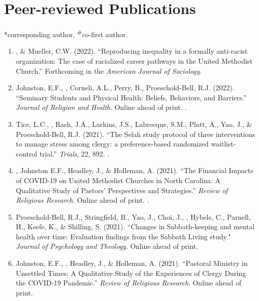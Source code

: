 \newcommand{\Revision}{\textit{under revision}}
\newcommand{\CS}{*} %
\newcommand{\CF}{\textsuperscript{\#}} %

\section*{Peer-reviewed Publications}
\CS corresponding author, \CF co-first author.

\begin{enumerate}
\item \Eagle, \& Mueller, C.W. (2022). ``Reproducing inequality in a formally anti-racist organization: The case of racialized career pathways in the United Methodist Church.'' Forthcoming in the \textit{American Journal of Sociology}.

\item Johnston, E.F., \Eagle, Corneli, A.L., Perry, B., Proeschold-Bell, R.J.  (2022). ``Seminary Students and Physical Health: Beliefs, Behaviors, and Barriers.'' \textit{Journal of Religion and Health}. Online ahead of print. .

\item Tice, L.C., \Eagle, Rash, J.A., Larkins, J.S., Labrecque, S.M., Platt, A., Yao, J., \& Proeschold-Bell, R.J. (2021). ``The Selah study protocol of three interventions to manage stress among clergy: a preference-based randomized waitlist-control trial.''  \textit{Trials}, 22, 892. .
	
\item \Eagle, Johnston E.F., Headley, J., \& Holleman, A. (2021). ``The Financial Impacts of COVID-19 on United Methodist Churches in North Carolina: A Qualitative Study of Pastors’ Perspectives and Strategies.'' \emph{Review of Religious Research}. Online ahead of print. .

\item Proeschold-Bell, R.J., Stringfield, B., Yao, J., Choi, J., \Eagle, Hybels, C., Parnell, H., Keefe, K., \& Shilling, S. (2021). ``Changes in Sabbath-keeping and mental health over time: Evaluation findings from the Sabbath Living study." \textit{Journal of Psychology and Theology}. Online ahead of print. 
	
\item Johnston, E.F., \Eagle, Headley, J., \& Holleman, A. (2021). ``Pastoral Ministry in Unsettled Times: A Qualitative Study of the Experiences of Clergy During the COVID-19 Pandemic.'' \textit{Review of Religious Research}. Online ahead of print. 


\end{enumerate}
